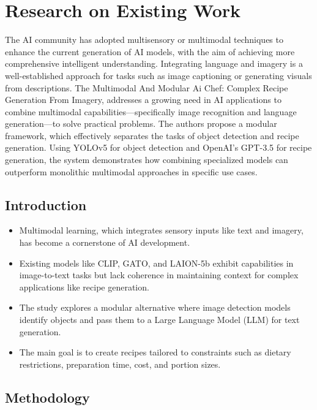 \documentclass[letterpaper,11pt]{report}
\begin{document}
\chapter{Research on Existing Work}\label{chapter:Research on Existing Work}
The AI community has adopted multisensory or multimodal techniques to enhance the current generation of AI models, with the aim of achieving more comprehensive intelligent understanding. Integrating language and imagery is a well-established approach for tasks such as image captioning or generating visuals from descriptions. The Multimodal And Modular Ai Chef: Complex Recipe Generation From Imagery, addresses a growing need in AI applications to combine multimodal capabilities—specifically image recognition and language generation—to solve practical problems. The authors propose a modular framework, which effectively separates the tasks of object detection and recipe generation. Using YOLOv5 for object detection and OpenAI's GPT-3.5 for recipe generation, the system demonstrates how combining specialized models can outperform monolithic multimodal approaches in specific use cases.

\section{Introduction}
\begin{itemize}
    \item Multimodal learning, which integrates sensory inputs like text and imagery, has become a cornerstone of AI development.
    \item Existing models like CLIP, GATO, and LAION-5b exhibit capabilities in image-to-text tasks but lack coherence in maintaining context for complex applications like recipe generation.
    \item The study explores a modular alternative where image detection models identify objects and pass them to a Large Language Model (LLM) for text generation.
    \item The main goal is to create recipes tailored to constraints such as dietary restrictions, preparation time, cost, and portion sizes.
\end{itemize}

\section{Methodology}
\end{document}

